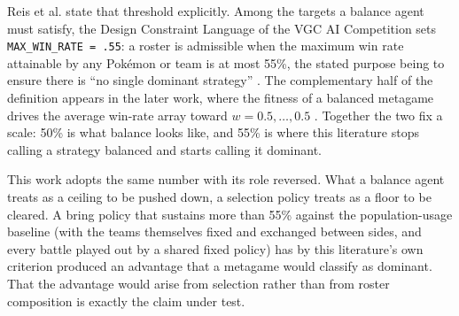 \documentclass[conference]{IEEEtran}
\begin{document}
Reis et al. state that threshold explicitly. Among the targets a balance agent
must satisfy, the Design Constraint Language of the VGC AI Competition sets
\texttt{MAX\_WIN\_RATE = .55}: a roster is admissible when the maximum win rate
attainable by any Pok\'emon or team is at most 55\%, the stated purpose being
to ensure there is ``no single dominant strategy'' \cite{reis2021}. The
complementary half of the definition appears in the later work, where the
fitness of a balanced metagame drives the average win-rate array toward
$w = 0.5, \ldots, 0.5$ \cite{reis2024}. Together the two fix a scale: 50\% is
what balance looks like, and 55\% is where this literature stops calling a
strategy balanced and starts calling it dominant.

This work adopts the same number with its role reversed. What a balance agent
treats as a ceiling to be pushed down, a selection policy treats as a floor to
be cleared. A bring policy that sustains more than 55\% against the
population-usage baseline (with the teams themselves fixed and exchanged
between sides, and every battle played out by a shared fixed policy) has by
this literature's own criterion produced an advantage that a metagame would
classify as dominant. That the advantage would arise from selection rather than
from roster composition is exactly the claim under test.
\end{document}
